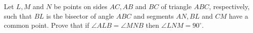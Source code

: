 Let $L,M$ and $N$ be points on sides $AC,AB$ and $BC$ of triangle $ABC$,  respectively, such that $BL$ is the bisector of angle $ABC$ and segments $AN,BL$ and $CM$ have a common point. Prove that if $\angle ALB=\angle MNB$ then $\angle LNM=90^{\circ}$.